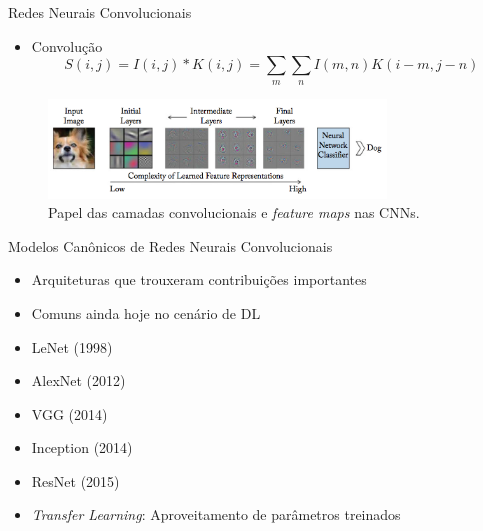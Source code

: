 \begin{frame}{Redes Neurais Convolucionais}
   \ \  \\[0.1cm]
   \begin{itemize}
     \item Convolução
     \begin{equation}
      S(i,j) = I(i,j)*K(i,j) = \sum_{m}\sum_{n}I(m,n)K(i-m,j-n)\label{eq:conv_img}
     \end{equation}
   \end{itemize}
   \begin{figure}[!h]
   	\centering
   	\label{fig:convolutions}
   	\includegraphics[width=0.8\textwidth]{./img/fundamenta/convolutions}
     \caption{Papel das camadas convolucionais e \emph{feature maps} nas CNNs.}
   \end{figure}
\end{frame}

\begin{frame}{\LARGE{Modelos Canônicos de Redes Neurais Convolucionais}}
   \ \  \\[0.1cm]
   \begin{itemize}
     \item Arquiteturas que trouxeram contribuições importantes
     \item Comuns ainda hoje no cenário de DL
     \ \ \newline
     \item LeNet (1998)
     \item AlexNet (2012)
     \item VGG (2014)
     \item Inception (2014)
     \item ResNet (2015)
     \ \ \newline
     \item \emph{Transfer Learning}: Aproveitamento de parâmetros treinados
   \end{itemize}
\end{frame}

